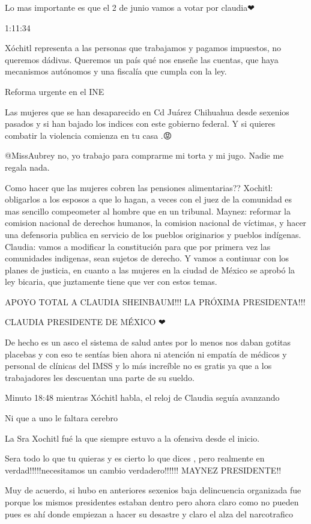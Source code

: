 Lo mas importante es que el 2 de junio vamos a votar por claudia❤

1:11:34

Xóchitl representa a las personas que trabajamos y pagamos impuestos, no queremos dádivas. Queremos un país qué nos enseñe las cuentas, que haya mecanismos autónomos y una fiscalía que cumpla con la ley.

Reforma urgente en el INE

Las mujeres  que se han desaparecido  en Cd Juárez Chihuahua desde sexenios pasados y si han bajado los indices con  este gobierno federal.
Y si quieres combatir la violencia  comienza en tu casa .😡

​@MissAubrey no, yo trabajo para comprarme mi torta y mi jugo. Nadie me regala nada.

Como hacer que las mujeres cobren las pensiones alimentarias??
Xochitl: obligarlos a los esposos a que lo hagan, a veces con el juez de la comunidad es mas sencillo compeometer al hombre que en un tribunal.
Maynez: reformar la comision nacional de  derechos humanos, la comision nacional de víctimas, y hacer una defensoria publica en servicio de los pueblos originarios y pueblos indígenas.
Claudia: vamos a modificar la constitución para que por primera vez las comunidades indigenas, sean sujetos de derecho. Y vamos a continuar con los planes de justicia, en cuanto a las mujeres en la ciudad de México se aprobó la ley bicaria, que juztamente tiene que ver con estos temas.

APOYO TOTAL A CLAUDIA SHEINBAUM!!! LA PRÓXIMA PRESIDENTA!!!

CLAUDIA PRESIDENTE DE MÉXICO ❤

De hecho es un asco el sistema de salud antes por lo menos nos daban gotitas placebas y con eso te sentías bien ahora ni atención ni empatía de médicos y personal de clínicas del IMSS y lo más increíble no es gratis ya que a los trabajadores les descuentan una parte de su sueldo.

Minuto 18:48  mientras Xóchitl habla, el reloj de Claudia seguía avanzando

Ni que a uno le faltara cerebro

La Sra Xochitl fué la que siempre estuvo a la ofensiva desde el inicio.

Sera todo lo que tu quieras y es cierto lo que dices , pero realmente en verdad!!!!!necesitamos un cambio verdadero!!!!!!  MAYNEZ PRESIDENTE!!

Muy de acuerdo, si hubo en anteriores sexenios baja delincuencia organizada fue porque los mismos presidentes estaban dentro pero ahora claro como no pueden pues es ahí donde empiezan a hacer su desastre y claro el alza del narcotrafico

